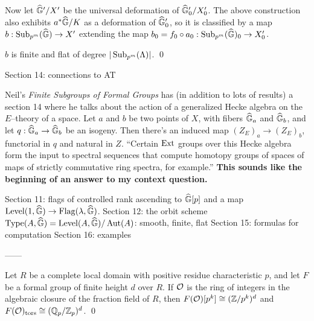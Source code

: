 Now let $\widehat{\mathbb G}' / X'$ be the universal deformation of $\widehat{\mathbb G}'_0 / X'_0$.  The above construction also exhibits $a^* \widehat{\mathbb G}/K$ as a deformation of $\widehat{\mathbb G}'_0$, so it is classified by a map $b: \operatorname{Sub}_{p^m}(\widehat{\mathbb G}) \to X'$ extending the map $b_0 = f_0 \circ a_0: \operatorname{Sub}_{p^m}(\widehat{\mathbb G})_0 \to X'_0$.

\begin{theorem}
$b$ is finite and flat of degree $|\operatorname{Sub}_{p^m}(\Lambda)|$. \qed
\end{theorem}


Section 14: connections to AT

Neil's \textit{Finite Subgroups of Formal Groups} has (in addition to lots of results) a section 14 where he talks about the action of a generalized Hecke algebra on the $E$--theory of a space.  Let $a$ and $b$ be two points of $X$, with fibers $\widehat{\mathbb G}_a$ and $\widehat{\mathbb G}_b$, and let $q: \widehat{\mathbb G}_a \to \widehat{\mathbb G}_b$ be an isogeny.  Then there's an induced map $(Z_E)_a \to (Z_E)_b$, functorial in $q$ and natural in $Z$.  ``Certain $\operatorname{Ext}$ groups over this Hecke algebra form the input to spectral sequences that compute homotopy groups of spaces of maps of strictly commutative ring spectra, for example.''  \textbf{This sounds like the beginning of an answer to my context question.}

Section 11: flags of controlled rank ascending to $\widehat{\mathbb G}[p]$ and a map $\operatorname{Level}(1, \widehat{\mathbb G}) \to \operatorname{Flag}(\lambda, \widehat{\mathbb G})$.
Section 12: the orbit scheme $\operatorname{Type}(A, \widehat{\mathbb G}) = \operatorname{Level}(A, \widehat{\mathbb G}) / \operatorname{Aut}(A)$: smooth, finite, flat
Section 15: formulas for computation
Section 16: examples

------

\begin{theorem}
Let $R$ be a complete local domain with positive residue characteristic $p$, and let $F$ be a formal group of finite height $d$ over $R$.  If $\mathcal{O}$ is the ring of integers in the algebraic closure of the fraction field of $R$, then $F(\mathcal{O})[p^k] \cong (\mathbb Z/p^k)^d$ and $F(\mathcal{O})_{\mathrm{tors}} \cong (\mathbb{Q}_p / \mathbb Z_p)^d$. \qed
\end{theorem}

